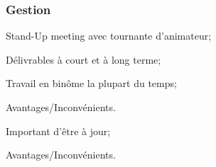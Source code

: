 \begin{frame}
\frametitle{Gestion}
\begin{description}
	\item[Méthode SCRUM] 
	\item Stand-Up meeting avec tournante d'animateur;
	\item Délivrables à court et à long terme;
	\item Travail en binôme la plupart du temps;
	\item Avantages/Inconvénients.
	\item[Git]
	\item Important d'être à jour;
	\item Avantages/Inconvénients.
\end{description}
\end{frame}